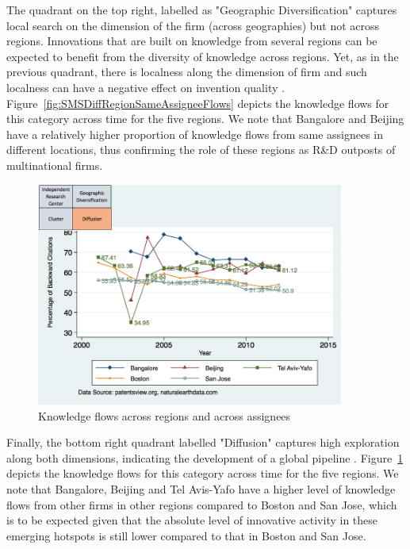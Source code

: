 \documentclass[parskip=full,10pt,letterpaper]{article}
\begin{document}
The quadrant on the top right, labelled as "Geographic Diversification" captures local search on the dimension of the firm (across geographies) but not across regions. Innovations that are built on knowledge from several regions can be expected to benefit from the diversity of knowledge across regions. Yet, as in the previous quadrant, there is localness along the dimension of firm and such localness can have a negative effect on invention quality \citep{Rosenkopf2001}. Figure~\ref{fig:SMSDiffRegionSameAssigneeFlows} depicts the  knowledge flows for this category across time for the five regions. We note that Bangalore and Beijing have a relatively higher proportion of knowledge flows from same assignees in different locations, thus confirming the role of these regions as R\&D outposts of multinational firms.\par

\begin{figure}[h!]
\begin{centering}
  \includegraphics[width=0.90\textwidth]{SMSDiffRegionDiffAssigneeFlows}
  \caption{Knowledge flows across regions and across assignees}
  \label{fig:SMSDiffRegionDiffAssigneeFlows}
\end{centering}
\end{figure}

Finally, the bottom right quadrant labelled "Diffusion" captures high exploration along both dimensions, indicating the development of a global pipeline \citep{Harald2004}. Figure~\ref{fig:SMSDiffRegionDiffAssigneeFlows} depicts the  knowledge flows for this category across time for the five regions. We note that Bangalore, Beijing and Tel Avis-Yafo have a higher level of knowledge flows from other firms in other regions compared to Boston and San Jose, which is to be expected given that the absolute level of innovative activity in these emerging hotspots is still lower compared to that in Boston and San Jose. \par
\end{document}
